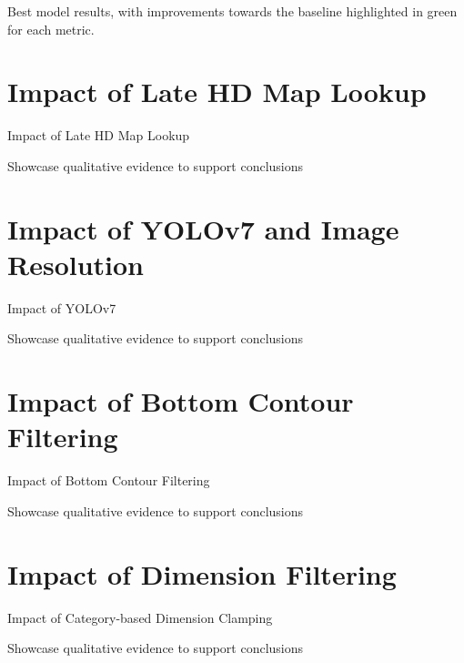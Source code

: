 \begin{table}[htbp]
    
    \caption{Best model results, with improvements towards the baseline highlighted in green for each metric.}
    \label{tbl:best}
\end{table}


\section{Impact of Late HD Map Lookup}
\label{sec:impactlatemap}

Impact of Late HD Map Lookup

Showcase qualitative evidence to support conclusions

\newpage


\section{Impact of YOLOv7 and Image Resolution}
\label{sec:impactyolov7}

Impact of YOLOv7

Showcase qualitative evidence to support conclusions

\newpage


\section{Impact of Bottom Contour Filtering}
\label{sec:impactcontourfiltering}

Impact of Bottom Contour Filtering

Showcase qualitative evidence to support conclusions

\newpage


\section{Impact of Dimension Filtering}
\label{sec:impactsizefiltering}

Impact of Category-based Dimension Clamping

Showcase qualitative evidence to support conclusions

